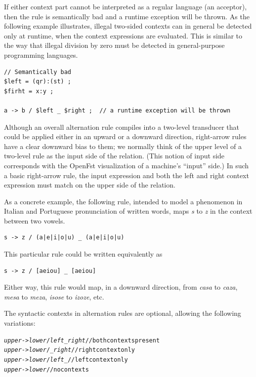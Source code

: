\noindent
If either context part cannot be interpreted as a regular language (an acceptor), then the rule is semantically bad and
a runtime exception will be thrown.  As the following example illustrates, illegal two-sided contexts can in general be detected
only at runtime, when the context expressions are evaluated.  This is similar to the way that illegal division by zero
must be detected in general-purpose programming languages.

\begin{Verbatim}
// Semantically bad
$left = (qr):(st) ;
$firht = x:y ;

a -> b / $left _ $right ;  // a runtime exception will be thrown
\end{Verbatim}


Although an overall alternation rule compiles into a two-level transducer that could be applied either in an
upward or a downward direction, right-arrow rules have a clear downward bias to them;
we normally think of the upper level of a two-level rule as the input side of the
relation.  (This notion of input side corresponds with the OpenFst visualization of a
machine's ``input'' side.)
In such a basic right-arrow rule, the input expression and both the left
and right context expression must match on the upper side of the relation.

As a concrete example, the following rule, intended to model a phenomenon in Italian and Portuguese
pronunciation of written words, maps \emph{s} to \emph{z} in the context between two vowels.


\begin{Verbatim}
s -> z / (a|e|i|o|u) _ (a|e|i|o|u)
\end{Verbatim}

\noindent
This particular rule could be written equivalently as


\begin{Verbatim}
s -> z / [aeiou] _ [aeiou]
\end{Verbatim}

\noindent
Either way, this rule would map, in a downward direction, from \emph{casa} to \emph{caza}, \emph{mesa} to \emph{meza},
\emph{isose} to \emph{izoze}, etc.

The syntactic contexts in alternation rules are optional, allowing the following variations:

\begin{alltt}
\emph{upper} -> \emph{lower} / \emph{left} _ \emph{right} // both contexts present
\emph{upper} -> \emph{lower} /     _ \emph{right}         // right context only
\emph{upper} -> \emph{lower} / \emph{left} _              // left context only
\emph{upper} -> \emph{lower}                              // no contexts
\end{alltt}

